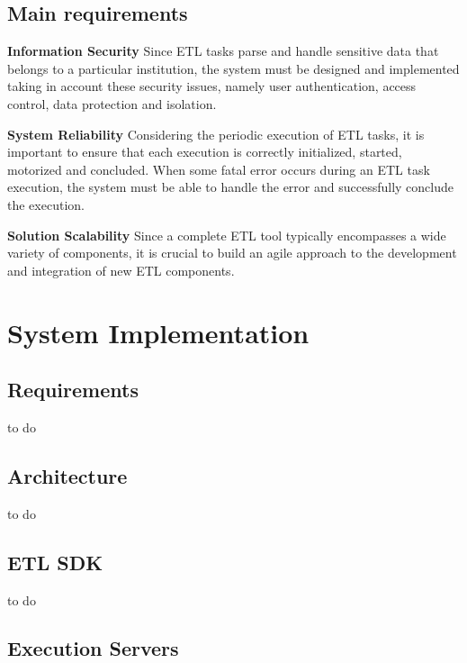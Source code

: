 \documentclass[
  11pt,
]{krantz}
\begin{document}
\hypertarget{main-requirements}{%
\section{Main requirements}\label{main-requirements}}

\textbf{Information Security}
Since ETL tasks parse and handle sensitive data that belongs to a particular institution, the system must be designed and implemented taking in account these security issues, namely user authentication, access control, data protection and isolation.

\textbf{System Reliability}
Considering the periodic execution of ETL tasks, it is important to ensure that each execution is correctly initialized, started, motorized and concluded. When some fatal error occurs during an ETL task execution, the system must be able to handle the error and successfully conclude the execution.

\textbf{Solution Scalability}
Since a complete ETL tool typically encompasses a wide variety of components, it is crucial to build an agile approach to the development and integration of new ETL components.

\hypertarget{system-implementation}{%
\chapter{System Implementation}\label{system-implementation}}

\hypertarget{requirements}{%
\section{Requirements}\label{requirements}}

to do

\hypertarget{architecture}{%
\section{Architecture}\label{architecture}}

to do

\hypertarget{etl-sdk}{%
\section{ETL SDK}\label{etl-sdk}}

to do

\hypertarget{execution-servers}{%
\section{Execution Servers}\label{execution-servers}}
\end{document}
